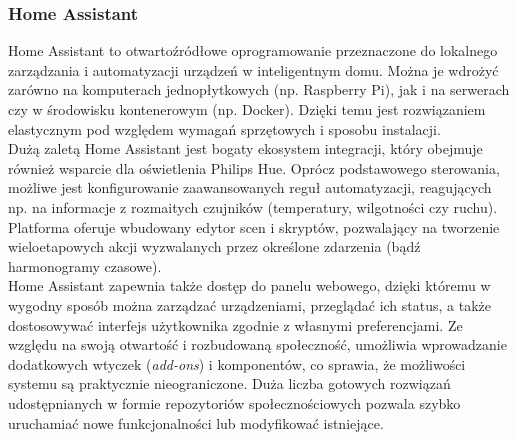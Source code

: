 \documentclass[12pt]{article}
\begin{document}
\subsubsection{Home Assistant}
Home Assistant to otwartoźródłowe oprogramowanie przeznaczone do lokalnego zarządzania i automatyzacji urządzeń w inteligentnym domu.
Można je wdrożyć zarówno na komputerach jednopłytkowych (np. Raspberry Pi), jak i na serwerach czy w środowisku kontenerowym (np. Docker).
Dzięki temu jest rozwiązaniem elastycznym pod względem wymagań sprzętowych i sposobu instalacji.\\
Dużą zaletą Home Assistant jest bogaty ekosystem integracji, który obejmuje również wsparcie
dla oświetlenia Philips Hue. Oprócz podstawowego sterowania, możliwe jest konfigurowanie zaawansowanych reguł automatyzacji,
reagujących np. na informacje z rozmaitych czujników (temperatury, wilgotności czy ruchu).
Platforma oferuje wbudowany edytor scen i skryptów, pozwalający na tworzenie wieloetapowych akcji wyzwalanych przez określone zdarzenia
(bądź harmonogramy czasowe).\\
Home Assistant zapewnia także dostęp do panelu webowego, dzięki któremu w wygodny sposób można zarządzać urządzeniami,
przeglądać ich status, a także dostosowywać interfejs użytkownika zgodnie z własnymi preferencjami.
Ze względu na swoją otwartość i rozbudowaną społeczność, umożliwia wprowadzanie dodatkowych wtyczek (\textit{add-ons})
i komponentów, co sprawia, że możliwości systemu są praktycznie nieograniczone.
Duża liczba gotowych rozwiązań udostępnianych w formie repozytoriów społecznościowych pozwala
szybko uruchamiać nowe funkcjonalności lub modyfikować istniejące.
\end{document}
